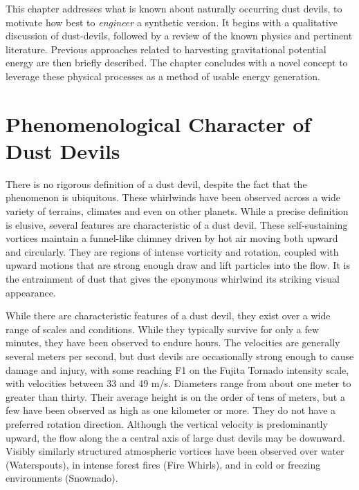 \label{sec:physics}

This chapter addresses what is known about naturally occurring dust
devils, to motivate how best to \textit{engineer} a synthetic version. 
It begins with a qualitative discussion of dust-devils, followed by a
review of the known physics and pertinent literature. Previous approaches
related to harvesting gravitational potential energy are then briefly
described. The chapter concludes with a novel concept to leverage these physical
processes as a method of usable energy generation. 


\section{Phenomenological Character of Dust Devils}
\label{subsec:phenomena}

There is no rigorous definition of a dust devil, despite the fact that
the phenomenon is ubiquitous. These whirlwinds have been
observed across a wide variety of terrains, climates and even on
other planets\cite{Sinclair1969,Bluestein2004,JGR:JGR13978,JGRE:JGRE1660}. 
While a precise definition is elusive, several features 
are characteristic of a dust devil. These self-sustaining vortices maintain
a funnel-like chimney driven by hot air moving both upward and
circularly. They are regions of intense vorticity and rotation, coupled
with upward motions that are strong enough draw and lift particles into
the flow. It is the entrainment of dust that gives the eponymous
whirlwind its striking visual appearance.  

While there are characteristic features of a dust devil, they exist over 
a wide range of scales and conditions. While they typically survive for
only a few minutes, they have been observed to endure hours. The
velocities are generally several meters per second, but
%
%
dust devils are occasionally strong enough to cause damage and injury,
with some reaching F1 on the Fujita Tornado intensity
scale\cite{Edwards_tornadointensity}, with velocities between 33 and 49
m/s. 
%
%
%
%
Diameters range from about one meter to greater than thirty.  Their
average height is on the order of tens of meters, but a few have been
observed as high as one kilometer or more. They do not have a
preferred rotation direction\cite{}. Although the vertical velocity 
is predominantly upward, the flow along the a central axis of large dust
devils may be downward. 
%
%
Visibly similarly structured atmospheric vortices have been observed over water
(Waterspouts), in intense forest fires (Fire Whirls), and in cold or
freezing environments (Snownado). 
%
%

